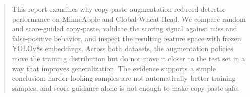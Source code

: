 \begin{abstract}
This report examines why copy-paste augmentation reduced detector performance on MinneApple and Global Wheat Head. We compare random and score-guided copy-paste, validate the scoring signal against miss and false-positive behavior, and inspect the resulting feature space with frozen YOLOv8s embeddings. Across both datasets, the augmentation policies move the training distribution but do not move it closer to the test set in a way that improves generalization. The evidence supports a simple conclusion: harder-looking samples are not automatically better training samples, and score guidance alone is not enough to make copy-paste safe.
\end{abstract}
